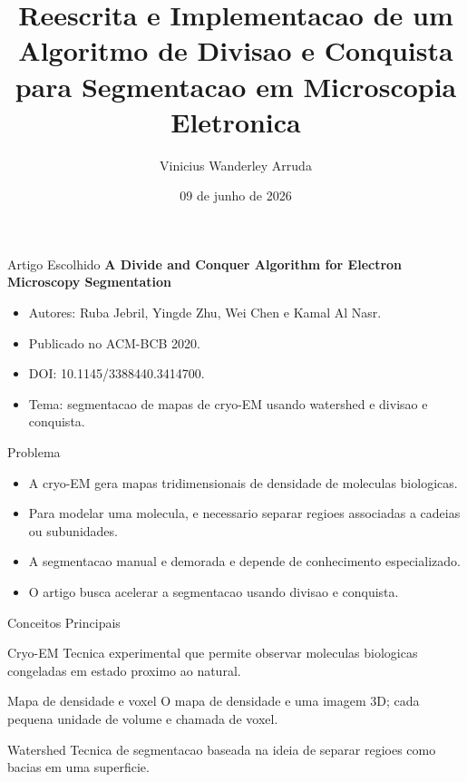 \documentclass[aspectratio=169]{beamer}
\title[Divisao e Conquista em Cryo-EM]{Reescrita e Implementacao de um Algoritmo de Divisao e Conquista para Segmentacao em Microscopia Eletronica}
\author{Vinicius Wanderley Arruda}
\institute{Projeto e Analise de Algoritmos \\ Prof. Warley Gramacho}
\date{09 de junho de 2026}
\begin{document}
\begin{frame}
  \titlepage
\end{frame}

\begin{frame}{Artigo Escolhido}
  \textbf{A Divide and Conquer Algorithm for Electron Microscopy Segmentation}

  \vspace{0.4cm}
  \begin{itemize}
    \item Autores: Ruba Jebril, Yingde Zhu, Wei Chen e Kamal Al Nasr.
    \item Publicado no ACM-BCB 2020.
    \item DOI: 10.1145/3388440.3414700.
    \item Tema: segmentacao de mapas de cryo-EM usando watershed e divisao e conquista.
  \end{itemize}
\end{frame}

\begin{frame}{Problema}
  \begin{itemize}
    \item A cryo-EM gera mapas tridimensionais de densidade de moleculas biologicas.
    \item Para modelar uma molecula, e necessario separar regioes associadas a cadeias ou subunidades.
    \item A segmentacao manual e demorada e depende de conhecimento especializado.
    \item O artigo busca acelerar a segmentacao usando divisao e conquista.
  \end{itemize}
\end{frame}

\begin{frame}{Conceitos Principais}
  \begin{block}{Cryo-EM}
    Tecnica experimental que permite observar moleculas biologicas congeladas em estado proximo ao natural.
  \end{block}

  \begin{block}{Mapa de densidade e voxel}
    O mapa de densidade e uma imagem 3D; cada pequena unidade de volume e chamada de voxel.
  \end{block}

  \begin{block}{Watershed}
    Tecnica de segmentacao baseada na ideia de separar regioes como bacias em uma superficie.
  \end{block}
\end{frame}
\end{document}
